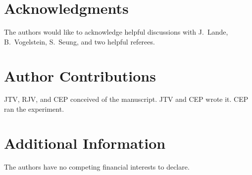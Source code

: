 \documentclass{article}
\newcommand{\hL}{\widehat{L}}
\begin{document}








\clearpage



\section*{Acknowledgments}

The authors would like to acknowledge helpful discussions with J.~Lande, B.~Vogelstein, S.~Seung, and two helpful referees.

\section*{Author Contributions}

JTV, RJV, and CEP conceived of the manuscript.  JTV and CEP wrote it.  CEP ran the experiment.

\section*{Additional Information}

The authors have no competing financial interests to declare.
\end{document}
